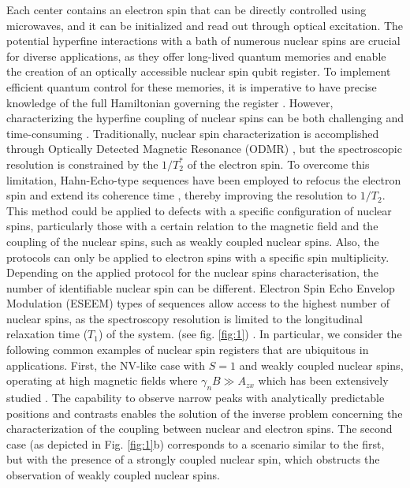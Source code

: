 \documentclass[%
 reprint,
superscriptaddress,
 amsmath,amssymb,
 aps,
]{revtex4-2}
\begin{document}
Each center contains an electron spin that can be directly controlled using microwaves, and it can be initialized and read out through optical excitation. 
The potential hyperfine interactions with a bath of numerous nuclear spins are crucial for diverse applications, as they offer long-lived quantum memories and enable the creation of an optically accessible nuclear spin qubit register.
To implement efficient quantum control for these memories, it is imperative to have precise knowledge of the full Hamiltonian governing the register \cite{vorobyov2023transition,bradley2022robust}.
However, characterizing the hyperfine coupling of nuclear spins can be both challenging and time-consuming \cite{abobeih2019atomic, van2024mapping}. 
Traditionally, nuclear spin characterization is accomplished through Optically Detected Magnetic Resonance (ODMR) \cite{dreau2012high,hesselmeier2024qudit}, but the spectroscopic resolution is constrained by the $1/T_2^\ast$ of the electron spin. 
To overcome this limitation, Hahn-Echo-type sequences have been employed to refocus the electron spin and extend its coherence time \cite{childress2006coherent}, thereby improving the resolution to $1/T_2$. 
This method could be applied to defects with a specific configuration of nuclear spins, particularly those with a certain relation to the magnetic field and the coupling of the nuclear spins, such as weakly coupled nuclear spins.
Also, the protocols can only be applied to electron spins with a specific spin multiplicity.
Depending on the applied protocol for the nuclear spins characterisation, the number of identifiable nuclear spin can be different.
Electron Spin Echo Envelop Modulation (ESEEM) types of sequences allow access to the highest number of nuclear spins, as the spectroscopy resolution is limited to the longitudinal relaxation time ($T_1$) of the system. (see fig. \ref{fig:1}) \cite{laraoui2013high, vorobyov2022addressing}.
In particular, we consider the following common examples of nuclear spin registers that are ubiquitous in applications. First, the NV-like case with $S=1$ and weakly coupled nuclear spins, operating at high magnetic fields where $\gamma_n B \gg A_{zx}$ which has been extensively studied \cite{abobeih2019atomic, taminiau2012detection, zhao2014dynamical}.
The capability to observe narrow peaks with analytically predictable positions and contrasts enables the solution of the inverse problem concerning the characterization of the coupling between nuclear and electron spins. 
The second case (as depicted in Fig. \ref{fig:1}b) corresponds to a scenario similar to the first, but with the presence of a strongly coupled nuclear spin, which obstructs the observation of weakly coupled nuclear spins.
\end{document}
